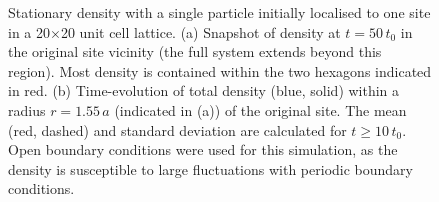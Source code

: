 \begin{figure}[ht]
    \centering
    \hfill
    \caption{Stationary density with a single particle initially localised to one site in a 20$\times$20 unit cell lattice. (a) Snapshot of density at $t=50\,t_0$ in the original site vicinity (the full system extends beyond this region). Most density is contained within the two hexagons indicated in red. (b) Time-evolution of total density (blue, solid) within a radius $r=1.55\,a$ (indicated in (a)) of the original site. The mean (red, dashed) and standard deviation are calculated for $t\geq10\,t_0$. Open boundary conditions were used for this simulation, as the density is susceptible to large fluctuations with periodic boundary conditions.}
    \label{Fig:Original_Site_Vicinity}
\end{figure}